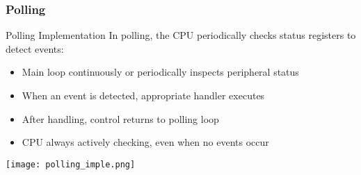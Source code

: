 \subsubsection{Polling}

\begin{theorem}{Polling Implementation}
In polling, the CPU periodically checks status registers to detect events:
\begin{itemize}
    \item Main loop continuously or periodically inspects peripheral status
    \item When an event is detected, appropriate handler executes
    \item After handling, control returns to polling loop
    \item CPU always actively checking, even when no events occur
\end{itemize}
\texttt{[image: polling\_imple.png]}
\end{theorem}



